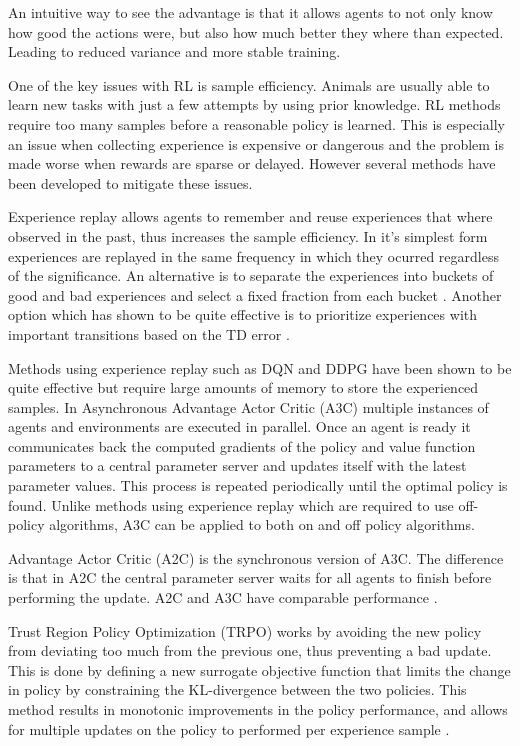 An intuitive way to see the advantage is that it allows agents to not only know how good the actions were, but also how much better they where than expected. Leading to reduced variance and more stable training.

One of the key issues with RL is sample efficiency. Animals are usually able to learn new tasks with just a few attempts by using prior knowledge. RL methods require too many samples before a reasonable policy is learned. This is especially an issue when collecting experience is expensive or dangerous and the problem is made worse when rewards are sparse or delayed. However several methods have been developed to mitigate these issues. 

Experience replay allows agents to remember and reuse experiences that where observed in the past, thus increases the sample efficiency. In it's simplest form experiences are replayed in the same frequency in which they ocurred regardless of the significance. An alternative is to separate the experiences into buckets of good and bad experiences and select a fixed fraction from each bucket \cite{narasimhan2015language}. Another option which has shown to be quite effective is to prioritize experiences with important transitions based on the TD error \cite{schaul2015prioritized}. 

Methods using experience replay such as DQN and DDPG have been shown to be quite effective but require large amounts of memory to store the experienced samples. In Asynchronous Advantage Actor Critic (A3C) \cite{mnih2016asynchronous} multiple instances of agents and environments are executed in parallel. Once an agent is ready it communicates back the computed gradients of the policy and value function parameters to a central parameter server and updates itself with the latest parameter values. This process is repeated periodically until the optimal policy is found. Unlike methods using experience replay which are required to use off-policy algorithms, A3C can be applied to both on and off policy algorithms.

Advantage Actor Critic (A2C) is the synchronous version of A3C. The difference is that in A2C the central parameter server waits for all agents to finish before performing the update. A2C and A3C have comparable performance \cite{mnih2016asynchronous}.

Trust Region Policy Optimization (TRPO) works by avoiding the new policy from deviating too much from the previous one, thus preventing a bad update. This is done by defining a new surrogate objective function that limits the change in policy by constraining the KL-divergence between the two policies. This method results in monotonic improvements in the policy performance, and allows for multiple updates on the policy to performed per experience sample \cite{schulman2015trust}.

